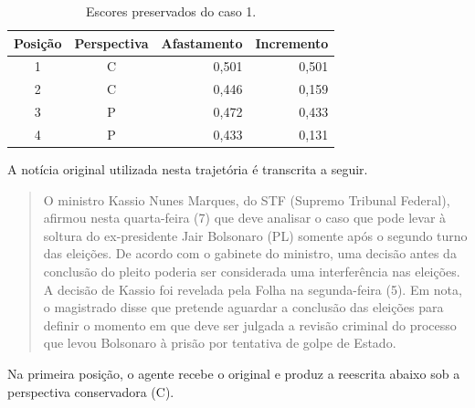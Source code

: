 \begin{table}[htb]
\centering
\caption{Escores preservados do caso 1.}
\label{tab:ap-caso-politico}
\begin{tabular}{ccrr}
\hline
Posição & Perspectiva & Afastamento & Incremento \\
\hline
1 & C & 0,501 & 0,501 \\
2 & C & 0,446 & 0,159 \\
3 & P & 0,472 & 0,433 \\
4 & P & 0,433 & 0,131 \\
\hline
\end{tabular}
\end{table}

A notícia original utilizada nesta trajetória é transcrita a seguir.

\begin{quote}
\begin{SingleSpace}
\small
O ministro Kassio Nunes Marques, do STF (Supremo Tribunal Federal), afirmou nesta quarta-feira (7) que deve analisar o caso que pode levar à soltura do ex-presidente Jair Bolsonaro (PL) somente após o segundo turno das eleições. De acordo com o gabinete do ministro, uma decisão antes da conclusão do pleito poderia ser considerada uma interferência nas eleições. A decisão de Kassio foi revelada pela Folha na segunda-feira (5). Em nota, o magistrado disse que pretende aguardar a conclusão das eleições para definir o momento em que deve ser julgada a revisão criminal do processo que levou Bolsonaro à prisão por tentativa de golpe de Estado.
\end{SingleSpace}
\end{quote}
Na primeira posição, o agente recebe o original e produz a reescrita abaixo sob a perspectiva conservadora (C).

